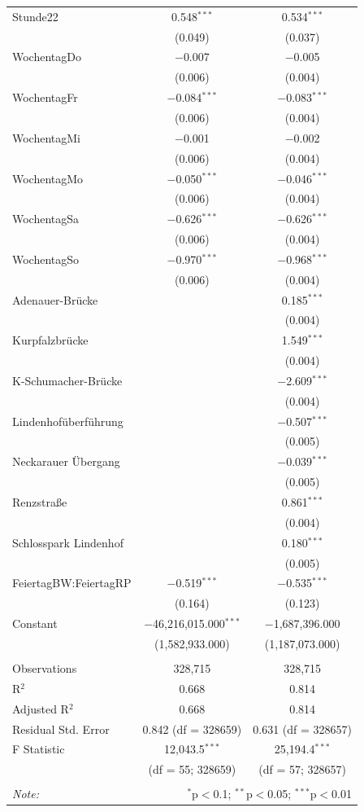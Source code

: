 \documentclass[a4paper,12pt]{thesis}
\begin{document}
\begin{longtable}{@{\extracolsep{-5pt}}lcc}
		Stunde22 & 0.548$^{***}$ & 0.534$^{***}$ \\ 
		& (0.049) & (0.037) \\ 
		WochentagDo & $-$0.007 & $-$0.005 \\ 
		& (0.006) & (0.004) \\ 
		WochentagFr & $-$0.084$^{***}$ & $-$0.083$^{***}$ \\ 
		& (0.006) & (0.004) \\ 
		WochentagMi & $-$0.001 & $-$0.002 \\ 
		& (0.006) & (0.004) \\ 
		WochentagMo & $-$0.050$^{***}$ & $-$0.046$^{***}$ \\ 
		& (0.006) & (0.004) \\ 
		WochentagSa & $-$0.626$^{***}$ & $-$0.626$^{***}$ \\ 
		& (0.006) & (0.004) \\ 
		WochentagSo & $-$0.970$^{***}$ & $-$0.968$^{***}$ \\ 
		& (0.006) & (0.004) \\ 
		Adenauer-Brücke &  & 0.185$^{***}$ \\ 
		&  & (0.004) \\ 
		Kurpfalzbrücke &  & 1.549$^{***}$ \\ 
		&  & (0.004) \\ 
		K-Schumacher-Brücke &  & $-$2.609$^{***}$ \\ 
		&  & (0.004) \\ 
		Lindenhofüberführung &  & $-$0.507$^{***}$ \\ 
		&  & (0.005) \\ 
		Neckarauer Übergang &  & $-$0.039$^{***}$ \\ 
		&  & (0.005) \\ 
		Renzstraße &  & 0.861$^{***}$ \\ 
		&  & (0.004) \\ 
		Schlosspark Lindenhof &  & 0.180$^{***}$ \\ 
		&  & (0.005) \\ 
		FeiertagBW:FeiertagRP & $-$0.519$^{***}$ & $-$0.535$^{***}$ \\ 
		& (0.164) & (0.123) \\ 
		Constant & $-$46,216,015.000$^{***}$ & $-$1,687,396.000 \\ 
		& (1,582,933.000) & (1,187,073.000) \\ 
		\hline \\[-1.8ex] 
		Observations & 328,715 & 328,715 \\ 
		R$^{2}$ & 0.668 & 0.814 \\ 
		Adjusted R$^{2}$ & 0.668 & 0.814 \\ 
		Residual Std. Error & 0.842 (df = 328659) & 0.631 (df = 328657) \\ 
		F Statistic & 12,043.5$^{***}$  & 25,194.4$^{***}$ \\ 
		&(df = 55; 328659)& (df = 57; 328657)\\
		\hline 
		\hline \\[-1.8ex] 
		\textit{Note:}  & \multicolumn{2}{r}{$^{*}$p$<$0.1; $^{**}$p$<$0.05; $^{***}$p$<$0.01} \\ 
	\end{longtable}
\end{document}
